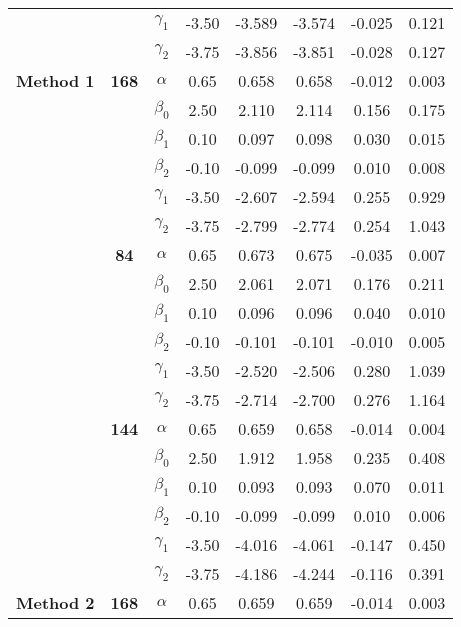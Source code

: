 \begin{table}[h]
\begin{tabular}[t]{>{}c>{}ccccccc}
 &  & $\gamma_1$ & -3.50 & -3.589 & -3.574 & -0.025 & 0.121\\

 &  & $\gamma_2$ & -3.75 & -3.856 & -3.851 & -0.028 & 0.127\\

\multirow{-18}{*}{\centering\arraybackslash \textbf{Method 1}} & \multirow{-6}{*}{\centering\arraybackslash \textbf{168}} & $\alpha$ & 0.65 & 0.658 & 0.658 & -0.012 & 0.003\\
\cmidrule{1-8}
 &  & $\beta_0$ & 2.50 & 2.110 & 2.114 & 0.156 & 0.175\\

 &  & $\beta_1$ & 0.10 & 0.097 & 0.098 & 0.030 & 0.015\\

 &  & $\beta_2$ & -0.10 & -0.099 & -0.099 & 0.010 & 0.008\\

 &  & $\gamma_1$ & -3.50 & -2.607 & -2.594 & 0.255 & 0.929\\

 &  & $\gamma_2$ & -3.75 & -2.799 & -2.774 & 0.254 & 1.043\\

 & \multirow{-6}{*}{\centering\arraybackslash \textbf{84}} & $\alpha$ & 0.65 & 0.673 & 0.675 & -0.035 & 0.007\\

 &  & $\beta_0$ & 2.50 & 2.061 & 2.071 & 0.176 & 0.211\\

 &  & $\beta_1$ & 0.10 & 0.096 & 0.096 & 0.040 & 0.010\\

 &  & $\beta_2$ & -0.10 & -0.101 & -0.101 & -0.010 & 0.005\\

 &  & $\gamma_1$ & -3.50 & -2.520 & -2.506 & 0.280 & 1.039\\

 &  & $\gamma_2$ & -3.75 & -2.714 & -2.700 & 0.276 & 1.164\\

 & \multirow{-6}{*}{\centering\arraybackslash \textbf{144}} & $\alpha$ & 0.65 & 0.659 & 0.658 & -0.014 & 0.004\\

 &  & $\beta_0$ & 2.50 & 1.912 & 1.958 & 0.235 & 0.408\\

 &  & $\beta_1$ & 0.10 & 0.093 & 0.093 & 0.070 & 0.011\\

 &  & $\beta_2$ & -0.10 & -0.099 & -0.099 & 0.010 & 0.006\\

 &  & $\gamma_1$ & -3.50 & -4.016 & -4.061 & -0.147 & 0.450\\

 &  & $\gamma_2$ & -3.75 & -4.186 & -4.244 & -0.116 & 0.391\\

\multirow{-18}{*}{\centering\arraybackslash \textbf{Method 2}} & \multirow{-6}{*}{\centering\arraybackslash \textbf{168}} & $\alpha$ & 0.65 & 0.659 & 0.659 & -0.014 & 0.003\\
\bottomrule
\end{tabular}
\end{table}
